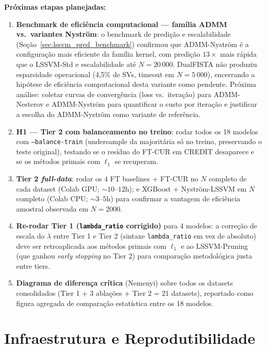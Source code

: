 \documentclass[12pt,a4paper]{article}
\begin{document}
\textbf{Próximas etapas planejadas:}
\begin{enumerate}\sloppy
  \item \textbf{Benchmark de eficiência computacional --- família ADMM vs.\
        variantes Nyström}: o benchmark de predição e escalabilidade
        (Seção~\ref{sec:lssvm_pred_benchmark}) confirmou que ADMM-Nyström
        é a configuração mais eficiente da família kernel, com predição
        $13{\times}$ mais rápida que o LSSVM-Std e escalabilidade até
        $N{=}20\,000$. DualFISTA não produziu esparsidade operacional
        (4,5\% de SVs, timeout em $N{=}5\,000$), encerrando a hipótese
        de eficiência computacional desta variante como pendente. Próxima
        análise: coletar curvas de convergência (loss vs.\ iteração) para
        ADMM-Nesterov e ADMM-Nyström para quantificar o custo por iteração
        e justificar a escolha do ADMM-Nyström como variante de referência.
  \item \textbf{H1 --- Tier 2 com balanceamento no treino}: rodar todos os
        18 modelos com \texttt{--balance-train} (undersample da
        majoritária só no treino, preservando o teste original), testando
        se o resíduo do FT-CUR em CREDIT desaparece e se os métodos
        primais com $\ell_1$ se recuperam.
  \item \textbf{Tier 2 \emph{full-data}}: rodar os $4$ FT baselines +
        FT-CUR no $N$ completo de cada dataset (Colab GPU; $\sim 10$--$12$h);
        e XGBoost + Nyström-LSSVM em $N$ completo (Colab CPU; $\sim 3$--$5$h)
        para confirmar a vantagem de eficiência amostral observada em
        $N=2000$.
  \item \textbf{Re-rodar Tier 1 (\texttt{lambda\_ratio} corrigido)} para
        4 modelos: a correção de escala do $\lambda$ entre Tier 1 e Tier 2
        (sintaxe \texttt{lambda\_ratio} em vez de absoluto) deve ser
        retroaplicada aos métodos primais com $\ell_1$ e ao
        LSSVM-Pruning (que ganhou \emph{early stopping} no Tier 2) para
        comparação metodológica justa entre tiers.
  \item \textbf{Diagrama de diferença crítica} (Nemenyi) sobre todos os
        datasets consolidados (Tier 1 + 3 ablações + Tier 2 = 21
        datasets), reportado como figura agregada de comparação
        estatística entre os 18 modelos.
\end{enumerate}

\appendix
\section{Infraestrutura e Reprodutibilidade}
\end{document}
